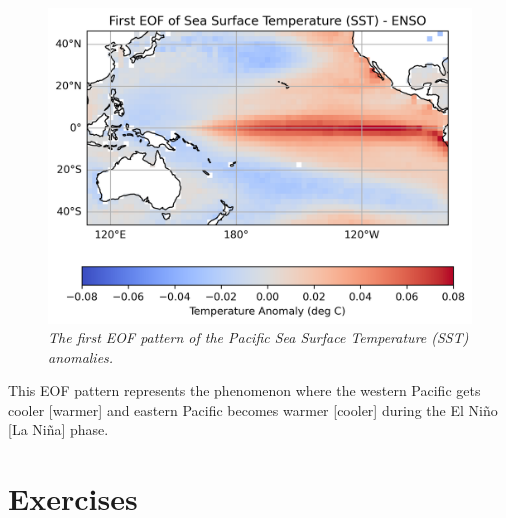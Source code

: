 \begin{figure}[h!]
\centering
\includegraphics[scale=0.75]{graphics/SST_EOF.png}
\caption{\textit{The first EOF pattern of the Pacific Sea Surface Temperature (SST) anomalies.}}
\label{fig:ENSOEOF}
\end{figure}
This EOF pattern represents the  phenomenon where the western Pacific gets cooler [warmer] and eastern Pacific becomes warmer [cooler] during the El Niño [La Niña] phase.

\section{Exercises}

